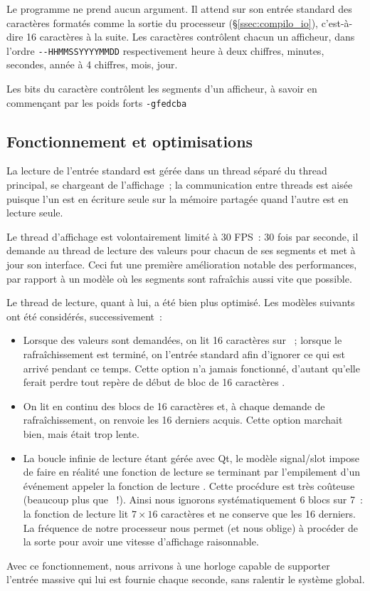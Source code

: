 \documentclass[11pt,a4paper]{article}
\begin{document}
Le programme ne prend aucun argument. Il attend sur son entrée standard des caractères formatés comme la sortie du processeur (§\ref{ssec:compilo_io}), c'est-à-dire 16 caractères à la suite. Les caractères contrôlent chacun un afficheur, dans l'ordre \verb!--HHMMSSYYYYMMDD! respectivement heure à deux chiffres, minutes, secondes, année à 4 chiffres, mois, jour.

Les bits du caractère contrôlent les segments d'un afficheur, à savoir en commençant par les poids forts \verb!-gfedcba!

\subsection{Fonctionnement et optimisations}

La lecture de l'entrée standard est gérée dans un thread séparé du thread principal, se chargeant de l'affichage~; la communication entre threads est aisée puisque l'un est en écriture seule sur la mémoire partagée quand l'autre est en lecture seule.

Le thread d'affichage est volontairement limité à 30 FPS~: 30 fois par seconde, il demande au thread de lecture des valeurs pour chacun de ses segments et met à jour son interface. Ceci fut une première amélioration notable des performances, par rapport à un modèle où les segments sont rafraîchis aussi vite que possible.

Le thread de lecture, quant à lui, a été bien plus optimisé. Les modèles suivants ont été considérés, successivement~:
\begin{itemize}
\item Lorsque des valeurs sont demandées, on lit 16 caractères sur ~; lorsque le rafraîchissement est terminé, on  l'entrée standard afin d'ignorer ce qui est arrivé pendant ce temps. Cette option n'a jamais fonctionné, d'autant qu'elle ferait perdre tout repère de \og début de bloc de 16 caractères \fg{}.

\item On lit en continu des blocs de 16 caractères et, à chaque demande de rafraîchissement, on renvoie les 16 derniers acquis. Cette option marchait bien, mais était trop lente.

\item La \og boucle infinie \fg{} de lecture étant gérée avec Qt, le modèle signal/slot impose de faire en réalité une fonction de lecture se terminant par l'empilement d'un événement \og appeler la fonction de lecture \fg{}. Cette procédure est très coûteuse (beaucoup plus que ~!). Ainsi nous ignorons systématiquement 6 blocs sur 7~: la fonction de lecture lit $7 \times 16$ caractères et ne conserve que les 16 derniers. La fréquence de notre processeur nous permet (et nous oblige) à procéder de la sorte pour avoir une vitesse d'affichage raisonnable.
\end{itemize}

Avec ce fonctionnement, nous arrivons à une horloge capable de supporter l'entrée massive qui lui est fournie chaque seconde, sans ralentir le système global.
\end{document}
